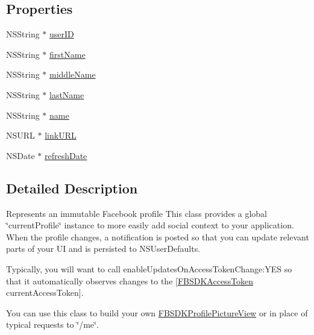 \subsection*{Properties}
\begin{DoxyCompactItemize}
\item 
N\-S\-String $\ast$ \hyperlink{interface_f_b_s_d_k_profile_a26a7f698acf093c0d7e2be81532d1d67}{user\-I\-D}
\item 
N\-S\-String $\ast$ \hyperlink{interface_f_b_s_d_k_profile_a31272e40b64d9f34df275b6fcd79fc7b}{first\-Name}
\item 
N\-S\-String $\ast$ \hyperlink{interface_f_b_s_d_k_profile_a27ffc05364ad2ebef222c9fb97a1369b}{middle\-Name}
\item 
N\-S\-String $\ast$ \hyperlink{interface_f_b_s_d_k_profile_ae6eb49fec06e9a53af370a18ab54e4a1}{last\-Name}
\item 
N\-S\-String $\ast$ \hyperlink{interface_f_b_s_d_k_profile_ac9dc573eea0b89119bc6564618cf959f}{name}
\item 
N\-S\-U\-R\-L $\ast$ \hyperlink{interface_f_b_s_d_k_profile_ad18140af79f94f03a1317ff4cb1a5b31}{link\-U\-R\-L}
\item 
N\-S\-Date $\ast$ \hyperlink{interface_f_b_s_d_k_profile_aef99209a7a849699d65189f37d90cfb7}{refresh\-Date}
\end{DoxyCompactItemize}


\subsection{Detailed Description}
Represents an immutable Facebook profile  This class provides a global \char`\"{}current\-Profile\char`\"{} instance to more easily add social context to your application. When the profile changes, a notification is posted so that you can update relevant parts of your U\-I and is persisted to N\-S\-User\-Defaults.

Typically, you will want to call {\ttfamily enable\-Updates\-On\-Access\-Token\-Change\-:Y\-E\-S} so that it automatically observes changes to the {\ttfamily \mbox{[}\hyperlink{interface_f_b_s_d_k_access_token}{F\-B\-S\-D\-K\-Access\-Token} current\-Access\-Token\mbox{]}}.

You can use this class to build your own {\ttfamily \hyperlink{interface_f_b_s_d_k_profile_picture_view}{F\-B\-S\-D\-K\-Profile\-Picture\-View}} or in place of typical requests to \char`\"{}/me\char`\"{}. 

